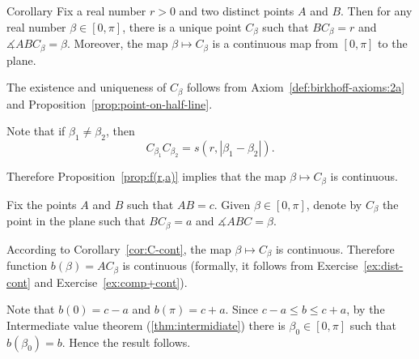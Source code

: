 \begin{thm}{Corollary}\label{cor:C-cont}
Fix a real number $r>0$ 
and two distinct points $A$ and $B$.
Then for 
any real number $\beta\in [0,\pi]$,
there is a unique point $C_\beta$ such that $BC_\beta=r$
and $\measuredangle ABC_\beta=\beta$.
Moreover, the map $\beta\mapsto C_\beta$ 
is a continuous map from $[0,\pi]$ to the plane.
\end{thm}

The existence and uniqueness of $C_\beta$ follows from Axiom~\ref{def:birkhoff-axioms:2a} and Proposition~\ref{prop:point-on-half-line}.

Note that if $\beta_1\ne\beta_2$, then
$$C_{\beta_1}C_{\beta_2}=s(r,|\beta_1-\beta_2|).$$

Therefore Proposition~\ref{prop:f(r,a)} implies that  the map $\beta\mapsto C_\beta$ is continuous.
\qeds





\label{page:proof:thm:abc}
Fix the points $A$ and $B$ such that $AB=c$.
Given $\beta\in [0,\pi]$,
denote by $C_\beta$ the point in the plane such that $BC_\beta=a$ and $\measuredangle ABC=\beta$.

According to Corollary~\ref{cor:C-cont},
the map
$\beta\mapsto C_\beta$ is continuous.
Therefore function $b(\beta)=AC_\beta$ is continuous
(formally, it follows from Exercise~\ref{ex:dist-cont} and Exercise~\ref{ex:comp+cont}).

Note that $b(0)=c-a$ and $b(\pi)=c+a$.
Since $c-a\le b\le c+a$,
by the Intermediate value theorem (\ref{thm:intermidiate})
there is $\beta_0\in[0,\pi]$ such that
$b(\beta_0)=b$.
Hence the result follows. 
\qeds



